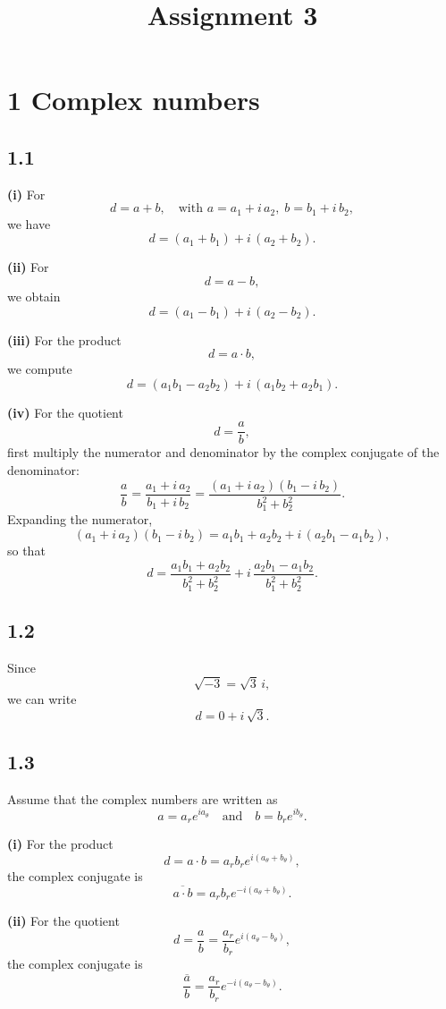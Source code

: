 \documentclass[12pt]{article}
\title{Assignment 3}
\begin{document}
\maketitle


\section{1 Complex numbers}

\subsection{1.1}

\textbf{(i)} For 
\[
d = a + b, \quad \text{with } a = a_1 + i\,a_2,\; b = b_1 + i\,b_2,
\]
we have
\[
d = (a_1 + b_1) + i\,(a_2 + b_2).
\]

\textbf{(ii)} For 
\[
d = a - b,
\]
we obtain
\[
d = (a_1 - b_1) + i\,(a_2 - b_2).
\]

\textbf{(iii)} For the product 
\[
d = a \cdot b,
\]
we compute
\[
d = (a_1b_1 - a_2b_2) + i\,(a_1b_2 + a_2b_1).
\]

\textbf{(iv)} For the quotient 
\[
d = \frac{a}{b},
\]
first multiply the numerator and denominator by the complex conjugate of the denominator:
\[
\frac{a}{b} = \frac{a_1 + i\,a_2}{b_1 + i\,b_2}
= \frac{(a_1 + i\,a_2)(b_1 - i\,b_2)}{b_1^2 + b_2^2}.
\]
Expanding the numerator,
\[
(a_1 + i\,a_2)(b_1 - i\,b_2) = a_1b_1 + a_2b_2 + i\,(a_2b_1 - a_1b_2),
\]
so that
\[
d = \frac{a_1b_1 + a_2b_2}{b_1^2+b_2^2} + i\,\frac{a_2b_1 - a_1b_2}{b_1^2+b_2^2}.
\]

\subsection{1.2}

Since
\[
\sqrt{-3} = \sqrt{3}\,i,
\]
we can write
\[
d = 0 + i\,\sqrt{3}.
\]

\subsection{1.3}

Assume that the complex numbers are written as 
\[
a = a_r e^{i a_\theta} \quad \text{and} \quad b = b_r e^{i b_\theta}.
\]

\textbf{(i)} For the product 
\[
d = a \cdot b = a_r b_r e^{i(a_\theta + b_\theta)},
\]
the complex conjugate is
\[
\overline{a\cdot b} = a_r b_r e^{-i(a_\theta + b_\theta)}.
\]

\textbf{(ii)} For the quotient 
\[
d = \frac{a}{b} = \frac{a_r}{b_r} e^{i(a_\theta - b_\theta)},
\]
the complex conjugate is
\[
\overline{\frac{a}{b}} = \frac{a_r}{b_r} e^{-i(a_\theta - b_\theta)}.
\]
\end{document}
